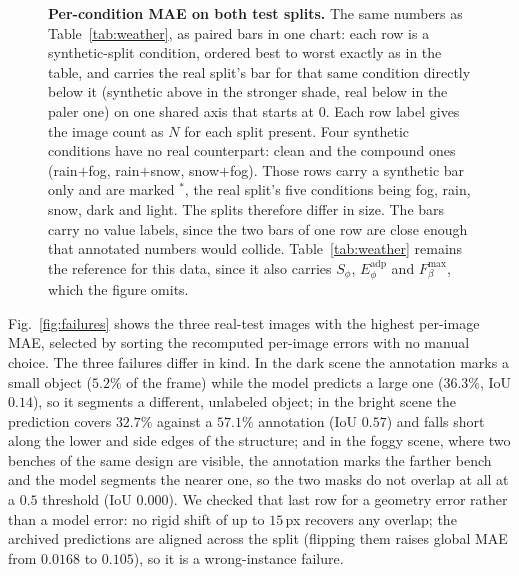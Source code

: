 \documentclass[10pt,a4paper,twocolumn,twoside]{article}
\begin{document}
\begin{figure}[!t]
\centering

\caption{\textbf{Per-condition MAE on both test splits.}
The same numbers as Table~\ref{tab:weather}, as paired bars in one chart: each row is a
synthetic-split condition, ordered best to worst exactly as in the table, and carries the
real split's bar for that same condition directly below it (synthetic above in the stronger
shade, real below in the paler one) on one shared axis that starts at $0$. Each row label
gives the image count as $N$ for each split present.
Four synthetic conditions have no real counterpart: clean and the compound ones
(rain${+}$fog, rain${+}$snow, snow${+}$fog). Those rows carry a synthetic bar only and
are marked $^{\ast}$, the real split's five conditions being fog, rain, snow, dark and
light. The splits therefore differ in size. The bars carry no value labels, since the two
bars of one row are close enough that annotated numbers would collide.
Table~\ref{tab:weather} remains the reference for this data, since it also carries
$S_\phi$, $E_\phi^{\text{adp}}$ and $F_\beta^{\max}$, which the figure omits.}
\label{fig:weatherbars}
\end{figure}

Fig.~\ref{fig:failures} shows the three real-test images with the highest per-image MAE,
selected by sorting the recomputed per-image errors with no manual choice. The three
failures differ in kind. In the dark scene the annotation marks a small object ($5.2\%$ of
the frame) while the model predicts a large one ($36.3\%$, IoU $0.14$), so it segments a
different, unlabeled object; in the bright scene the prediction covers $32.7\%$ against a
$57.1\%$ annotation (IoU $0.57$) and falls short along the lower and side edges of the
structure; and in the foggy scene, where two benches of the same design are visible, the
annotation marks the farther bench and the model segments the nearer one, so the two masks do
not overlap at all at a $0.5$ threshold (IoU $0.000$). We checked that last row for a
geometry error rather than a model error: no rigid shift of up to $15$\,px recovers any
overlap; the archived predictions are aligned across the split (flipping them raises
global MAE from $0.0168$ to $0.105$), so it is a wrong-instance failure.
\end{document}
